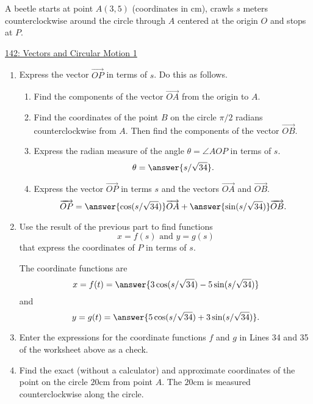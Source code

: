 \documentclass{ximera}
\begin{document}
\begin{question} \label{QIDdfdseIFDfeD}
A beetle starts at point $A(3,5)$ (coordinates in cm), crawls $s$ meters counterclockwise around the circle through $A$ centered at the origin $O$ and stops at $P$.

\begin{onlineOnly}
    \begin{center}
\end{center}
\end{onlineOnly}

\href{https://www.desmos.com/calculator/ufyt7kkxc0}{142: Vectors and Circular Motion 1}


\begin{enumerate}
\item Express the vector $\overrightarrow{OP}$ in terms of $s$. Do this as follows.

\begin{enumerate}
\item Find the components of the vector $\overrightarrow{OA}$ from the origin to $A$.

\item Find the coordinates of the point $B$ on the circle $\pi/2$ radians counterclockwise from $A$. Then find the components of the vector $\overrightarrow{OB}$.

\item Express the radian measure of the angle $\theta = \angle AOP$ in terms of $s$.
\[
   \theta = \answer{s/\sqrt{34}} .
\]

\item Express the vector $\overrightarrow{OP}$ in terms $s$ and the vectors $\overrightarrow{OA}$ and $\overrightarrow{OB}$.
\[
      \overrightarrow{OP} = \answer{\cos (s/\sqrt{34})} \overrightarrow{OA} + \answer{\sin (s/\sqrt{34})} \overrightarrow{OB} . 
\]

\end{enumerate}

\item Use the result of the previous part to find functions
\[
 x = f(s)  \text{ and } y=g(s)
\]
that express the coordinates of $P$ in terms of $s$.

The coordinate functions are 
\[
    x = f(t) = \answer{3\cos(s/\sqrt{34}) - 5\sin(s/\sqrt{34})}
\]
and
\[
    y = g(t) = \answer{5\cos(s/\sqrt{34}) + 3\sin(s/\sqrt{34})}.
\]

\item Enter the expressions for the coordinate functions $f$ and $g$ in Lines 34 and 35 of the worksheet above as a check.

\item Find the exact (without a calculator) and approximate coordinates of the point on the circle $20$cm from point $A$. The $20$cm is measured counterclockwise along the circle.



\end{enumerate}
\end{question}
\end{document}
